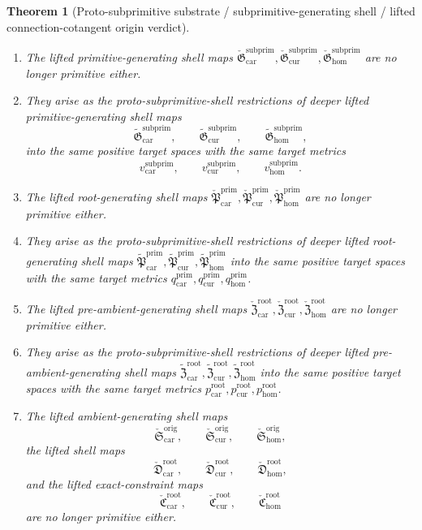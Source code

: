 \documentclass[11pt]{article}
\newcommand{\Car}{\mathrm{car}}
\newcommand{\Cur}{\mathrm{cur}}
\newcommand{\Hom}{\mathrm{hom}}
\newcommand{\RootTargetMetric}[1]{p_{#1}^{\mathrm{root}}}
\newcommand{\PrimTargetMetric}[1]{q_{#1}^{\mathrm{prim}}}
\newcommand{\SubprimTargetMetric}[1]{v_{#1}^{\mathrm{subprim}}}
\newcommand{\ProtoSubprimLiftedPrimitive}[1]{\check{\mathfrak G}_{#1}^{\mathrm{subprim}}}
\newcommand{\ProtoSubprimLiftedRoot}[1]{\check{\mathfrak P}_{#1}^{\mathrm{prim}}}
\newcommand{\ProtoSubprimLiftedPreAmbient}[1]{\check{\mathfrak Z}_{#1}^{\mathrm{root}}}
\newcommand{\ProtoSubprimLiftedAmbient}[1]{\check{\mathfrak S}_{#1}^{\mathrm{orig}}}
\newcommand{\ProtoSubprimLiftedShell}[1]{\check{\mathfrak D}_{#1}^{\mathrm{root}}}
\newcommand{\ProtoSubprimConstraintMap}[1]{\check{\mathfrak C}_{#1}^{\mathrm{root}}}
\newcommand{\PreProtoSubprimLiftedPrimitive}[1]{\widetilde{\mathfrak G}_{#1}^{\mathrm{subprim}}}
\newcommand{\PreProtoSubprimLiftedRoot}[1]{\widetilde{\mathfrak P}_{#1}^{\mathrm{prim}}}
\newcommand{\PreProtoSubprimLiftedPreAmbient}[1]{\widetilde{\mathfrak Z}_{#1}^{\mathrm{root}}}
\newtheorem{theorem}{Theorem}
\begin{document}
\begin{theorem}[Proto-subprimitive substrate / subprimitive-generating shell / lifted connection-cotangent origin verdict]
\begin{enumerate}
    \item The lifted primitive-generating shell maps \(\ProtoSubprimLiftedPrimitive{\Car},\ProtoSubprimLiftedPrimitive{\Cur},\ProtoSubprimLiftedPrimitive{\Hom}\) are no longer primitive either.
    \item They arise as the proto-subprimitive-shell restrictions of deeper lifted primitive-generating shell maps
    \[
    \PreProtoSubprimLiftedPrimitive{\Car},\qquad
    \PreProtoSubprimLiftedPrimitive{\Cur},\qquad
    \PreProtoSubprimLiftedPrimitive{\Hom},
    \]
    into the same positive target spaces with the same target metrics
    \[
    \SubprimTargetMetric{\Car},\qquad
    \SubprimTargetMetric{\Cur},\qquad
    \SubprimTargetMetric{\Hom}.
    \]
    \item The lifted root-generating shell maps \(\ProtoSubprimLiftedRoot{\Car},\ProtoSubprimLiftedRoot{\Cur},\ProtoSubprimLiftedRoot{\Hom}\) are no longer primitive either.
    \item They arise as the proto-subprimitive-shell restrictions of deeper lifted root-generating shell maps \(\PreProtoSubprimLiftedRoot{\Car},\PreProtoSubprimLiftedRoot{\Cur},\PreProtoSubprimLiftedRoot{\Hom}\) into the same positive target spaces with the same target metrics \(\PrimTargetMetric{\Car},\PrimTargetMetric{\Cur},\PrimTargetMetric{\Hom}\).
    \item The lifted pre-ambient-generating shell maps \(\ProtoSubprimLiftedPreAmbient{\Car},\ProtoSubprimLiftedPreAmbient{\Cur},\ProtoSubprimLiftedPreAmbient{\Hom}\) are no longer primitive either.
    \item They arise as the proto-subprimitive-shell restrictions of deeper lifted pre-ambient-generating shell maps \(\PreProtoSubprimLiftedPreAmbient{\Car},\PreProtoSubprimLiftedPreAmbient{\Cur},\PreProtoSubprimLiftedPreAmbient{\Hom}\) into the same positive target spaces with the same target metrics \(\RootTargetMetric{\Car},\RootTargetMetric{\Cur},\RootTargetMetric{\Hom}\).
    \item The lifted ambient-generating shell maps
    \[
    \ProtoSubprimLiftedAmbient{\Car},\qquad
    \ProtoSubprimLiftedAmbient{\Cur},\qquad
    \ProtoSubprimLiftedAmbient{\Hom},
    \]
    the lifted shell maps
    \[
    \ProtoSubprimLiftedShell{\Car},\qquad
    \ProtoSubprimLiftedShell{\Cur},\qquad
    \ProtoSubprimLiftedShell{\Hom},
    \]
    and the lifted exact-constraint maps
    \[
    \ProtoSubprimConstraintMap{\Car},\qquad
    \ProtoSubprimConstraintMap{\Cur},\qquad
    \ProtoSubprimConstraintMap{\Hom}
    \]
    are no longer primitive either.

\end{enumerate}
\end{theorem}
\end{document}
